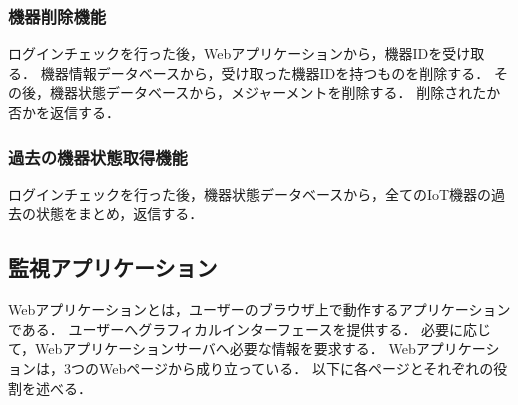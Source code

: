 \subsubsection{機器削除機能}
ログインチェックを行った後，Webアプリケーションから，機器IDを受け取る．
機器情報データベースから，受け取った機器IDを持つものを削除する．
その後，機器状態データベースから，メジャーメントを削除する．
削除されたか否かを返信する．
\subsubsection{過去の機器状態取得機能}
ログインチェックを行った後，機器状態データベースから，全てのIoT機器の過去の状態をまとめ，返信する．

\subsection{監視アプリケーション}
Webアプリケーションとは，ユーザーのブラウザ上で動作するアプリケーションである．
ユーザーへグラフィカルインターフェースを提供する．
必要に応じて，Webアプリケーションサーバへ必要な情報を要求する．
Webアプリケーションは，3つのWebページから成り立っている．
以下に各ページとそれぞれの役割を述べる．
